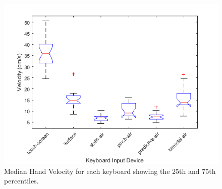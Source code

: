 \begin{figure}[t]
	\centering
	\includegraphics{Figures/fig_velocity_hand_boxplot}
	\caption[Hand Velocity Boxplot]{Median Hand Velocity for each keyboard showing the 25th and 75th percentiles.}
	\label{fig_velocity_hand_boxplot}
\end{figure}

